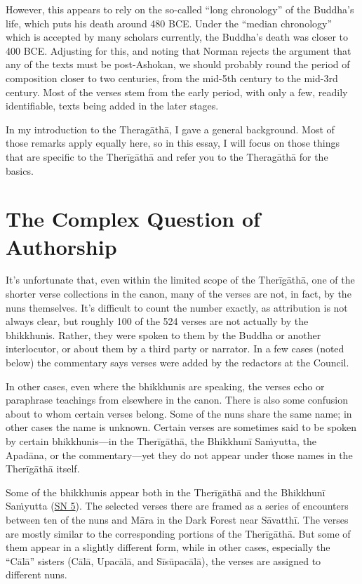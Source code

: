 \documentclass[12pt,openany]{book}%
\begin{document}
However, this appears to rely on the so-called “long chronology” of the Buddha’s life, which puts his death around 480 BCE. Under the “median chronology” which is accepted by many scholars currently, the Buddha’s death was closer to 400 BCE. Adjusting for this, and noting that Norman rejects the argument that any of the texts must be post-Ashokan, we should probably round the period of composition closer to two centuries, from the mid-5th century to the mid-3rd century. Most of the verses stem from the early period, with only a few, readily identifiable, texts being added in the later stages.

In my introduction to the \textsanskrit{Theragāthā}, I gave a general background. Most of those remarks apply equally here, so in this essay, I will focus on those things that are specific to the \textsanskrit{Therīgāthā} and refer you to the \textsanskrit{Theragāthā} for the basics.

\section*{The Complex Question of Authorship}

It’s unfortunate that, even within the limited scope of the \textsanskrit{Therīgāthā}, one of the shorter verse collections in the canon, many of the verses are not, in fact, by the nuns themselves. It’s difficult to count the number exactly, as attribution is not always clear, but roughly 100 of the 524 verses are not actually by the bhikkhunis. Rather, they were spoken to them by the Buddha or another interlocutor, or about them by a third party or narrator. In a few cases (noted below) the commentary says verses were added by the redactors at the Council.

In other cases, even where the bhikkhunis are speaking, the verses echo or paraphrase teachings from elsewhere in the canon. There is also some confusion about to whom certain verses belong. Some of the nuns share the same name; in other cases the name is unknown. Certain verses are sometimes said to be spoken by certain bhikkhunis—in the \textsanskrit{Therīgāthā}, the \textsanskrit{Bhikkhunī} \textsanskrit{Saṁyutta}, the \textsanskrit{Apadāna}, or the commentary—yet they do not appear under those names in the \textsanskrit{Therīgāthā} itself.

Some of the bhikkhunis appear both in the \textsanskrit{Therīgāthā} and the \textsanskrit{Bhikkhunī} \textsanskrit{Saṁyutta} (\href{https://suttacentral.net/sn5}{SN 5}). The selected verses there are framed as a series of encounters between ten of the nuns and \textsanskrit{Māra} in the Dark Forest near \textsanskrit{Sāvatthī}. The verses are mostly similar to the corresponding portions of the \textsanskrit{Therīgāthā}. But some of them appear in a slightly different form, while in other cases, especially the “\textsanskrit{Cālā}” sisters (\textsanskrit{Cālā}, \textsanskrit{Upacālā}, and \textsanskrit{Sīsūpacālā}), the verses are assigned to different nuns.
\end{document}
